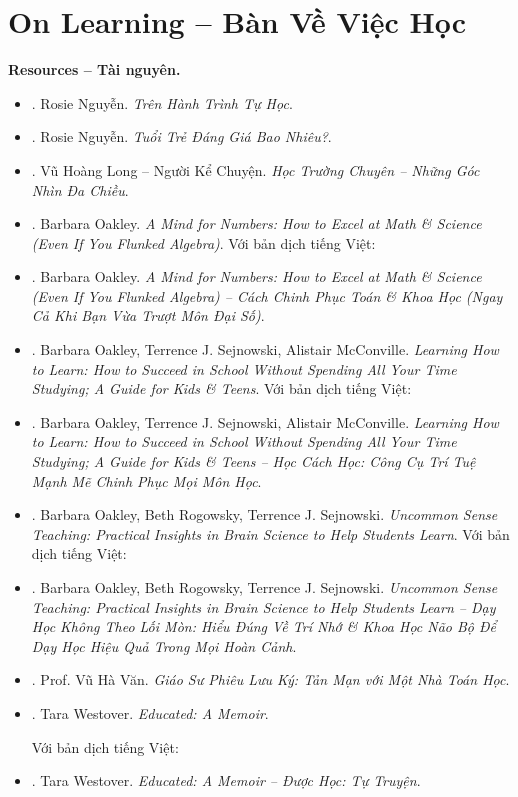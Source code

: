 \documentclass[12pt]{article}
\begin{document}
\section{On Learning -- Bàn Về Việc Học}
\label{sect: learning}
\textbf{\textsf{Resources -- Tài nguyên.}}
\begin{itemize}
	\item \cite{Rosie_self_study}. {\sc Rosie Nguyễn}. {\it Trên Hành Trình Tự Học}.
	\item \cite{Rosie_youth}. {\sc Rosie Nguyễn}. {\it Tuổi Trẻ Đáng Giá Bao Nhiêu?}.
	\item \cite{Long2021}. {\sc Vũ Hoàng Long -- Người Kể Chuyện}. {\it Học Trường Chuyên -- Những Góc Nhìn Đa Chiều}.
	\item \cite{Oakley_mind_number}. {\sc Barbara Oakley}. {\it A Mind for Numbers: How to Excel at Math \& Science (Even If You Flunked Algebra)}. Với bản dịch tiếng Việt:
	\item \cite{Oakley_mind_number_VN}. {\sc Barbara Oakley}. {\it A Mind for Numbers: How to Excel at Math \& Science (Even If You Flunked Algebra) -- Cách Chinh Phục Toán \& Khoa Học (Ngay Cả Khi Bạn Vừa Trượt Môn Đại Số)}.
	\item \cite{Oakley_Sejnowski_McConville_learn_how_learn}. {\sc Barbara Oakley, Terrence J. Sejnowski, Alistair McConville}. {\it Learning How to Learn: How to Succeed in School Without Spending All Your Time Studying; A Guide for Kids \& Teens}. Với bản dịch tiếng Việt:
	\item \cite{Oakley_Sejnowski_McConville_learn_how_learn_VN}. {\sc Barbara Oakley, Terrence J. Sejnowski, Alistair McConville}. {\it Learning How to Learn: How to Succeed in School Without Spending All Your Time Studying; A Guide for Kids \& Teens -- Học Cách Học: Công Cụ Trí Tuệ Mạnh Mẽ Chinh Phục Mọi Môn Học}.
	\item \cite{Oakley_Rogowsky_Sejnowski_McConville_uncommon_sense_teaching}. {\sc Barbara Oakley, Beth Rogowsky, Terrence J. Sejnowski}. {\it Uncommon Sense Teaching: Practical Insights in Brain Science to Help Students Learn}. Với bản dịch tiếng Việt:
	\item \cite{Oakley_Rogowsky_Sejnowski_McConville_uncommon_sense_teaching_VN}. {\sc Barbara Oakley, Beth Rogowsky, Terrence J. Sejnowski}. {\it Uncommon Sense Teaching: Practical Insights in Brain Science to Help Students Learn -- Dạy Học Không Theo Lối Mòn: Hiểu Đúng Về Trí Nhớ \& Khoa Học Não Bộ Để Dạy Học Hiệu Quả Trong Mọi Hoàn Cảnh}.
	\item \cite{VanVu2022}. Prof. {\sc Vũ Hà Văn}. {\it Giáo Sư Phiêu Lưu Ký: Tản Mạn với Một Nhà Toán Học}.
	\item \cite{Westover_educated}. {\sc Tara Westover}. {\it Educated: A Memoir}.
	
	Với bản dịch tiếng Việt:
	\item \cite{Westover_educated_VN}. {\sc Tara Westover}. {\it Educated: A Memoir -- Được Học: Tự Truyện}.
\end{itemize}
\end{document}
